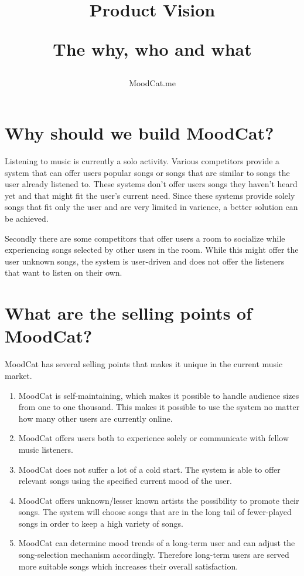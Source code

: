 \documentclass[10pt,a4paper]{article}
\begin{document}
\title{Product Vision\\
	\begin{small}
	The why, who and what
	\end{small}
}
\author{MoodCat.me}
\maketitle

\section{Why should we build MoodCat?}
Listening to music is currently a solo activity.
Various competitors provide a system that can offer users popular songs or songs that are similar to songs the user already listened to.
These systems don't offer users songs they haven't heard yet and that might fit the user's current need.
Since these systems provide solely songs that fit only the user and are very limited in varience, a better solution can be achieved.

Secondly there are some competitors that offer users a room to socialize while experiencing songs selected by other users in the room.
While this might offer the user unknown songs, the system is user-driven and does not offer the listeners that want to listen on their own.

\section{What are the selling points of MoodCat?}
MoodCat has several selling points that makes it unique in the current music market.

\begin{enumerate}
\item MoodCat is self-maintaining, which makes it possible to handle audience sizes from one to one thousand.
This makes it possible to use the system no matter how many other users are currently online.

\item MoodCat offers users both to experience solely or communicate with fellow music listeners.

\item MoodCat does not suffer a lot of a cold start.
The system is able to offer relevant songs using the specified current mood of the user.

\item MoodCat offers unknown/lesser known artists the possibility to promote their songs.
The system will choose songs that are in the long tail of fewer-played songs in order to keep a high variety of songs.

\item MoodCat can determine mood trends of a long-term user and can adjust the song-selection mechanism accordingly.
Therefore long-term users are served more suitable songs which increases their overall satisfaction.
\end{enumerate}
\end{document}
